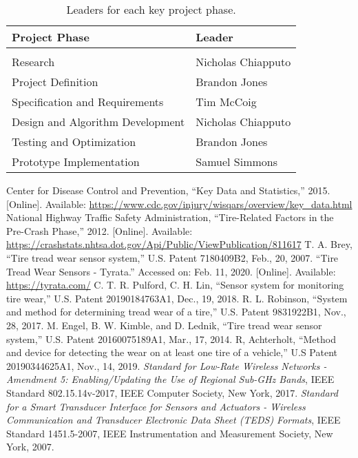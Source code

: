 \documentclass[11pt]{IEEEtran}
\begin{document}
			\begin{table}[tb]
				\centering
				\begin{tabularx}{\linewidth}{l|l}
					Project Phase 						& Leader \\
					\hline
					\vspace{-0.1in}						& \\
					Research 							& Nicholas Chiapputo \\
					Project Definition					& Brandon Jones \\
					Specification and Requirements 		& Tim McCoig \\
					Design and Algorithm Development 	& Nicholas Chiapputo \\
					Testing and Optimization 			& Brandon Jones \\
					Prototype Implementation 			& Samuel Simmons
				\end{tabularx}
				\caption{Leaders for each key project phase.}
				\label{tab:phaseLeaders}
			\end{table}

	\begin{thebibliography}{00}
		 Center for Disease Control and Prevention, ``Key Data and Statistics,'' 2015. [Online]. Available: \url{https://www.cdc.gov/injury/wisqars/overview/key_data.html}
		 National Highway Traffic Safety Administration, ``Tire-Related Factors in the Pre-Crash Phase,'' 2012. [Online]. Available: \url{https://crashstats.nhtsa.dot.gov/Api/Public/ViewPublication/811617}
		 T. A. Brey, ``Tire tread wear sensor system,'' U.S. Patent 7180409B2, Feb., 20, 2007.
		 ``Tire Tread Wear Sensors - Tyrata.'' Accessed on: Feb. 11, 2020. [Online]. Available: \url{https://tyrata.com/}
		 C. T. R. Pulford, C. H. Lin, ``Sensor system for monitoring tire wear,'' U.S. Patent 20190184763A1, Dec., 19, 2018.
		 R. L. Robinson, ``System and method for determining tread wear of a tire,'' U.S. Patent 9831922B1, Nov., 28, 2017.
		 M. Engel, B. W. Kimble, and D. Lednik, ``Tire tread wear sensor system,'' U.S. Patent 20160075189A1, Mar., 17, 2014.
		 R, Achterholt, ``Method and device for detecting the wear on at least one tire of a vehicle,'' U.S Patent 20190344625A1, Nov., 14, 2019.
    	 \textit{Standard for Low-Rate Wireless Networks - Amendment 5: Enabling/Updating the Use of Regional Sub-GHz Bands}, IEEE Standard 802.15.14v-2017, IEEE Computer Society, New York, 2017.
		 \textit{Standard for a Smart Transducer Interface for Sensors and Actuators - Wireless Communication and Transducer Electronic Data Sheet (TEDS) Formats}, IEEE Standard 1451.5-2007, IEEE Instrumentation and Measurement Society, New York, 2007. 

	\end{thebibliography}
\end{document}
